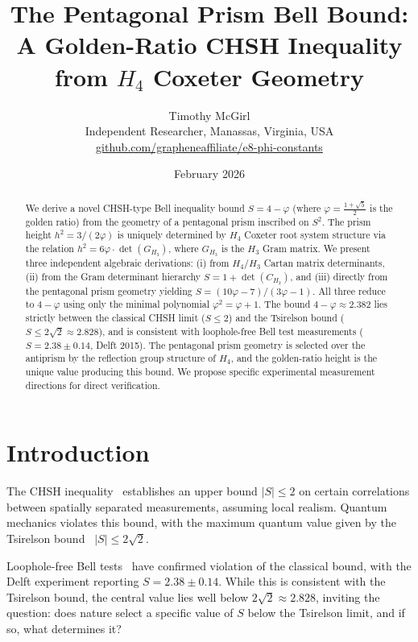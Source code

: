 \documentclass[12pt,a4paper]{article}
\title{\textbf{The Pentagonal Prism Bell Bound:\\A Golden-Ratio CHSH Inequality from $H_4$ Coxeter Geometry}}
\author{Timothy McGirl\\
\small Independent Researcher, Manassas, Virginia, USA\\
\small \href{https://github.com/grapheneaffiliate/e8-phi-constants}{github.com/grapheneaffiliate/e8-phi-constants}}
\date{February 2026}
\newcommand{\vp}{\varphi}
\newcommand{\detC}[1]{\det(C_{#1})}
\begin{document}
\maketitle

\begin{abstract}
We derive a novel CHSH-type Bell inequality bound $S = 4 - \vp$ 
(where $\vp = \tfrac{1+\sqrt{5}}{2}$ is the golden ratio) 
from the geometry of a pentagonal prism inscribed on $S^2$.
The prism height $h^2 = 3/(2\vp)$ is uniquely determined by 
$H_4$ Coxeter root system structure via the relation 
$h^2 = 6\vp \cdot \det(G_{H_3})$, where $G_{H_3}$ is the $H_3$ Gram matrix.
We present three independent algebraic derivations:
(i) from $H_4/H_3$ Cartan matrix determinants,
(ii) from the Gram determinant hierarchy $S = 1 + \detC{H_2}$,
and (iii) directly from the pentagonal prism geometry yielding
$S = (10\vp - 7)/(3\vp - 1)$.
All three reduce to $4 - \vp$ using only the minimal polynomial 
$\vp^2 = \vp + 1$.
The bound $4 - \vp \approx 2.382$ lies strictly between the 
classical CHSH limit ($S \leq 2$) and the Tsirelson bound 
($S \leq 2\sqrt{2} \approx 2.828$), and is consistent with 
loophole-free Bell test measurements ($S = 2.38 \pm 0.14$, 
Delft 2015). The pentagonal prism geometry is selected over 
the antiprism by the reflection group structure of $H_4$, 
and the golden-ratio height is the unique value producing 
this bound.
We propose specific experimental measurement directions 
for direct verification.
\end{abstract}

\tableofcontents
\vspace{1em}

\section{Introduction}
\label{sec:intro}

The CHSH inequality~\cite{clauser1969} establishes an upper bound $|S| \leq 2$
on certain correlations between spatially separated measurements, assuming local
realism. Quantum mechanics violates this bound, with the maximum quantum value
given by the Tsirelson bound~\cite{cirelson1980} $|S| \leq 2\sqrt{2}$.

Loophole-free Bell tests~\cite{hensen2015} have confirmed violation of the 
classical bound, with the Delft experiment reporting $S = 2.38 \pm 0.14$. While 
this is consistent with the Tsirelson bound, the central value lies well below 
$2\sqrt{2} \approx 2.828$, inviting the question: does nature select a specific 
value of $S$ below the Tsirelson limit, and if so, what determines it?
\end{document}
